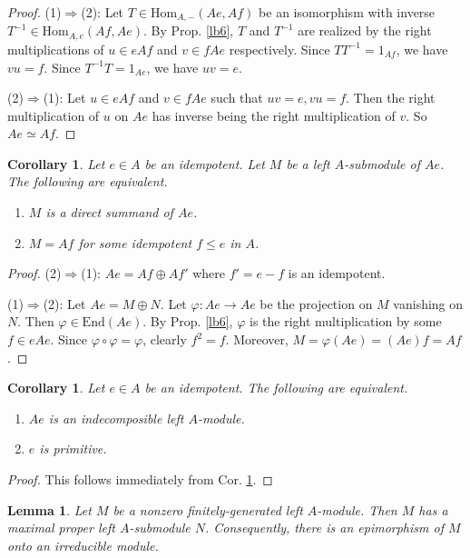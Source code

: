 \documentclass[11pt,b5paper,notitlepage]{article}
\theoremstyle{definition}
\theoremstyle{plain}
\newtheorem{co}[df]{Corollary}
\newtheorem{lm}[df]{Lemma}
\newcommand{\End}{\mathrm{End}} %
\newcommand{\Hom}{\mathrm{Hom}}
\numberwithin{equation}{section}
\begin{document}
\begin{proof}
(1)$\Rightarrow$(2): Let $T\in\Hom_{A,-}(Ae,Af)$ be an isomorphism with inverse $T^{-1}\in\Hom_{A,e}(Af,Ae)$. By Prop. \ref{lb6}, $T$ and $T^{-1}$ are realized by the right multiplications of $u\in eAf$ and $v\in fAe$ respectively. Since $TT^{-1}=1_{Af}$, we have $vu=f$. Since $T^{-1}T=1_{Ae}$, we have $uv=e$.

(2)$\Rightarrow$(1): Let $u\in eAf$ and $v\in fAe$ such that $uv=e,vu=f$. Then the right multiplication of $u$ on $Ae$ has inverse being the right multiplication of $v$. So $Ae\simeq Af$.
\end{proof}

\begin{co}\label{lb3}
Let $e\in A$ be an idempotent. Let $M$ be a left $A$-submodule of $Ae$. The following are equivalent.
\begin{enumerate}
\item[(1)] $M$ is a direct summand of $Ae$.
\item[(2)]  $M=Af$ for some idempotent $f\leq e$ in $A$.
\end{enumerate}
\end{co}

\begin{proof}
(2)$\Rightarrow$(1): $Ae=Af\oplus Af'$ where $f'=e-f$ is an idempotent.

(1)$\Rightarrow$(2): Let $Ae=M\oplus N$. Let $\varphi:Ae\rightarrow Ae$ be the projection on $M$ vanishing on $N$. Then $\varphi\in\End(Ae)$. By Prop. \ref{lb6}, $\varphi$ is the right multiplication by some $f\in eAe$. Since $\varphi\circ\varphi=\varphi$, clearly $f^2=f$. Moreover, $M=\varphi(Ae)=(Ae)f=Af$. 
\end{proof}



\begin{co}\label{lb5}
Let $e\in A$ be an idempotent. The following are equivalent.
\begin{enumerate}
\item[(1)] $Ae$ is an indecomposible left $A$-module.
\item[(2)] $e$ is primitive. 
\end{enumerate}
\end{co}

\begin{proof}
This follows immediately from Cor. \ref{lb3}.
\end{proof}




\begin{lm}\label{lb7}
Let $M$ be a nonzero finitely-generated left $A$-module. Then $M$ has a maximal proper left $A$-submodule $N$. Consequently, there is an epimorphism of $M$ onto an irreducible module.
\end{lm}
\end{document}
